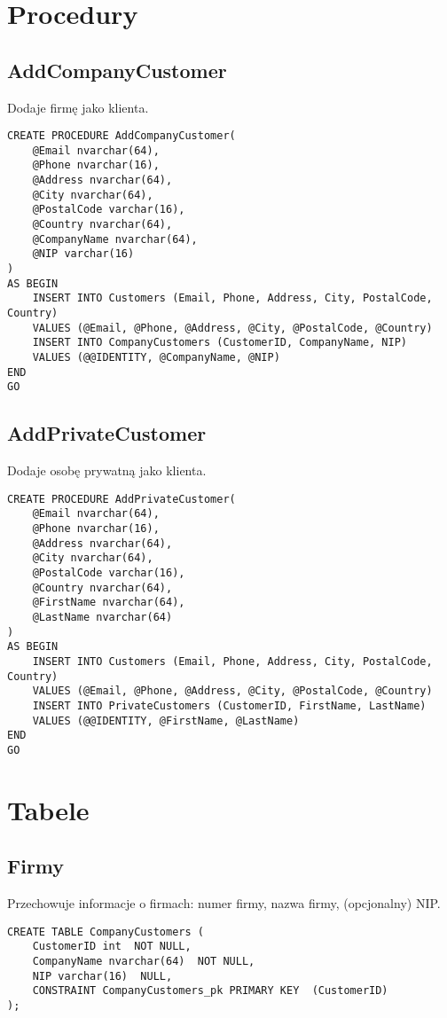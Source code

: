 \section{Procedury}
\subsection{AddCompanyCustomer}
Dodaje firmę jako klienta.
\begin{verbatim}
CREATE PROCEDURE AddCompanyCustomer(
    @Email nvarchar(64),
    @Phone nvarchar(16),
    @Address nvarchar(64),
    @City nvarchar(64),
    @PostalCode varchar(16),
    @Country nvarchar(64),
    @CompanyName nvarchar(64),
    @NIP varchar(16)
)
AS BEGIN
    INSERT INTO Customers (Email, Phone, Address, City, PostalCode, Country)
    VALUES (@Email, @Phone, @Address, @City, @PostalCode, @Country)
    INSERT INTO CompanyCustomers (CustomerID, CompanyName, NIP)
    VALUES (@@IDENTITY, @CompanyName, @NIP)
END
GO
\end{verbatim}
\subsection{AddPrivateCustomer}
Dodaje osobę prywatną jako klienta.
\begin{verbatim}
CREATE PROCEDURE AddPrivateCustomer(
    @Email nvarchar(64),
    @Phone nvarchar(16),
    @Address nvarchar(64),
    @City nvarchar(64),
    @PostalCode varchar(16),
    @Country nvarchar(64),
    @FirstName nvarchar(64),
    @LastName nvarchar(64)
)
AS BEGIN
    INSERT INTO Customers (Email, Phone, Address, City, PostalCode, Country)
    VALUES (@Email, @Phone, @Address, @City, @PostalCode, @Country)
    INSERT INTO PrivateCustomers (CustomerID, FirstName, LastName) 
    VALUES (@@IDENTITY, @FirstName, @LastName)
END
GO
\end{verbatim}
\section{Tabele}
\subsection{Firmy}
Przechowuje informacje o firmach: numer firmy, nazwa firmy, (opcjonalny) NIP.
\begin{verbatim}
CREATE TABLE CompanyCustomers (
    CustomerID int  NOT NULL,
    CompanyName nvarchar(64)  NOT NULL,
    NIP varchar(16)  NULL,
    CONSTRAINT CompanyCustomers_pk PRIMARY KEY  (CustomerID)
);
\end{verbatim}
